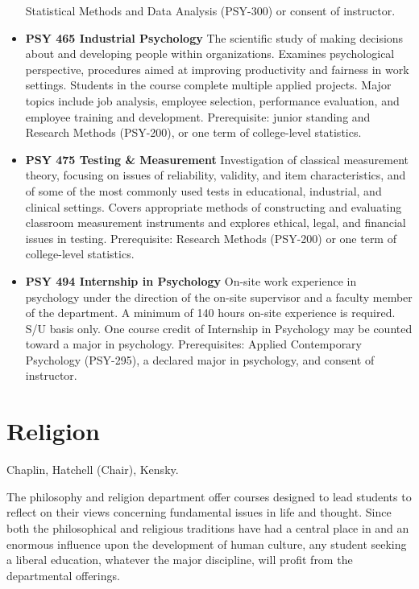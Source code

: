 \documentclass[
  letterpaper,
]{scrbook}
\begin{document}
\begin{itemize}
  Statistical Methods and Data Analysis (PSY-300) or consent of
  instructor.\\
\item
  \textbf{PSY 465 Industrial Psychology} The scientific study of making
  decisions about and developing people within organizations. Examines
  psychological perspective, procedures aimed at improving productivity
  and fairness in work settings. Students in the course complete
  multiple applied projects. Major topics include job analysis, employee
  selection, performance evaluation, and employee training and
  development. Prerequisite: junior standing and Research Methods
  (PSY-200), or one term of college-level statistics.
\item
  \textbf{PSY 475 Testing \& Measurement} Investigation of classical
  measurement theory, focusing on issues of reliability, validity, and
  item characteristics, and of some of the most commonly used tests in
  educational, industrial, and clinical settings. Covers appropriate
  methods of constructing and evaluating classroom measurement
  instruments and explores ethical, legal, and financial issues in
  testing. Prerequisite: Research Methods (PSY-200) or one term of
  college-level statistics.
\item
  \textbf{PSY 494 Internship in Psychology} On-site work experience in
  psychology under the direction of the on-site supervisor and a faculty
  member of the department. A minimum of 140 hours on-site experience is
  required. S/U basis only. One course credit of Internship in
  Psychology may be counted toward a major in psychology. Prerequisites:
  Applied Contemporary Psychology (PSY-295), a declared major in
  psychology, and consent of instructor.
\end{itemize}

\hypertarget{sec-religion}{%
\section{Religion}\label{sec-religion}}

Chaplin, Hatchell (Chair), Kensky.

The philosophy and religion department offer courses designed to lead
students to reflect on their views concerning fundamental issues in life
and thought. Since both the philosophical and religious traditions have
had a central place in and an enormous influence upon the development of
human culture, any student seeking a liberal education, whatever the
major discipline, will profit from the departmental offerings.
\end{document}
